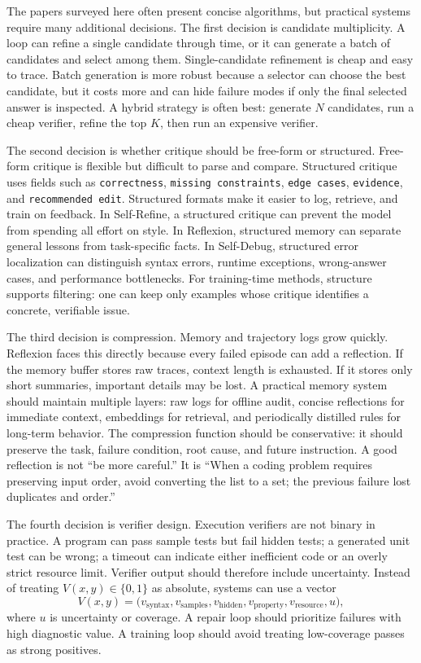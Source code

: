 The papers surveyed here often present concise algorithms, but practical systems require many additional decisions. The first decision is candidate multiplicity. A loop can refine a single candidate through time, or it can generate a batch of candidates and select among them. Single-candidate refinement is cheap and easy to trace. Batch generation is more robust because a selector can choose the best candidate, but it costs more and can hide failure modes if only the final selected answer is inspected. A hybrid strategy is often best: generate $N$ candidates, run a cheap verifier, refine the top $K$, then run an expensive verifier.

The second decision is whether critique should be free-form or structured. Free-form critique is flexible but difficult to parse and compare. Structured critique uses fields such as \texttt{correctness}, \texttt{missing constraints}, \texttt{edge cases}, \texttt{evidence}, and \texttt{recommended edit}. Structured formats make it easier to log, retrieve, and train on feedback. In Self-Refine, a structured critique can prevent the model from spending all effort on style. In Reflexion, structured memory can separate general lessons from task-specific facts. In Self-Debug, structured error localization can distinguish syntax errors, runtime exceptions, wrong-answer cases, and performance bottlenecks. For training-time methods, structure supports filtering: one can keep only examples whose critique identifies a concrete, verifiable issue.

The third decision is compression. Memory and trajectory logs grow quickly. Reflexion faces this directly because every failed episode can add a reflection. If the memory buffer stores raw traces, context length is exhausted. If it stores only short summaries, important details may be lost. A practical memory system should maintain multiple layers: raw logs for offline audit, concise reflections for immediate context, embeddings for retrieval, and periodically distilled rules for long-term behavior. The compression function should be conservative: it should preserve the task, failure condition, root cause, and future instruction. A good reflection is not ``be more careful.'' It is ``When a coding problem requires preserving input order, avoid converting the list to a set; the previous failure lost duplicates and order.''

The fourth decision is verifier design. Execution verifiers are not binary in practice. A program can pass sample tests but fail hidden tests; a generated unit test can be wrong; a timeout can indicate either inefficient code or an overly strict resource limit. Verifier output should therefore include uncertainty. Instead of treating $V(x,y)\in\{0,1\}$ as absolute, systems can use a vector
\begin{equation}
    V(x,y)=\bigl(v_{\mathrm{syntax}},v_{\mathrm{samples}},v_{\mathrm{hidden}},v_{\mathrm{property}},v_{\mathrm{resource}},u\bigr),
\end{equation}
where $u$ is uncertainty or coverage. A repair loop should prioritize failures with high diagnostic value. A training loop should avoid treating low-coverage passes as strong positives.

